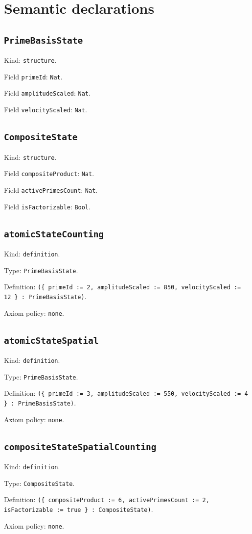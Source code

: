 \documentclass[11pt]{article}
\begin{document}
\section*{Semantic declarations}
\subsection*{\texttt{PrimeBasisState}}
\noindent Kind: \texttt{structure}.\par
\noindent Field \texttt{primeId}: \texttt{Nat}.\par
\noindent Field \texttt{amplitudeScaled}: \texttt{Nat}.\par
\noindent Field \texttt{velocityScaled}: \texttt{Nat}.\par
\subsection*{\texttt{CompositeState}}
\noindent Kind: \texttt{structure}.\par
\noindent Field \texttt{compositeProduct}: \texttt{Nat}.\par
\noindent Field \texttt{activePrimesCount}: \texttt{Nat}.\par
\noindent Field \texttt{isFactorizable}: \texttt{Bool}.\par
\subsection*{\texttt{atomicStateCounting}}
\noindent Kind: \texttt{definition}.\par
\noindent Type: \texttt{PrimeBasisState}.\par
\noindent Definition: \texttt{(\{ primeId := 2, amplitudeScaled := 850, velocityScaled := 12 \} : PrimeBasisState)}.\par
\noindent Axiom policy: \texttt{none}.\par
\subsection*{\texttt{atomicStateSpatial}}
\noindent Kind: \texttt{definition}.\par
\noindent Type: \texttt{PrimeBasisState}.\par
\noindent Definition: \texttt{(\{ primeId := 3, amplitudeScaled := 550, velocityScaled := 4 \} : PrimeBasisState)}.\par
\noindent Axiom policy: \texttt{none}.\par
\subsection*{\texttt{compositeStateSpatialCounting}}
\noindent Kind: \texttt{definition}.\par
\noindent Type: \texttt{CompositeState}.\par
\noindent Definition: \texttt{(\{ compositeProduct := 6, activePrimesCount := 2, isFactorizable := true \} : CompositeState)}.\par
\noindent Axiom policy: \texttt{none}.\par
\end{document}
